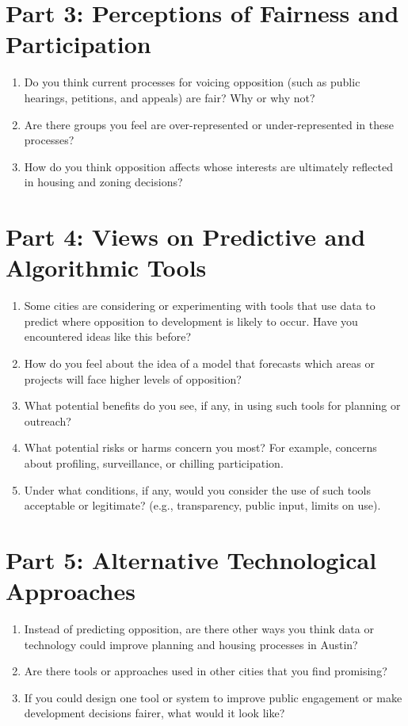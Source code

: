 \documentclass[10pt, letterpaper]{article}
\begin{document}
\section*{Part 3: Perceptions of Fairness and Participation}
\begin{enumerate}[leftmargin=*, label=\arabic*.]
    \item Do you think current processes for voicing opposition (such as public hearings, petitions, and appeals) are fair? Why or why not?
    \item Are there groups you feel are over-represented or under-represented in these processes?
    \item How do you think opposition affects whose interests are ultimately reflected in housing and zoning decisions?
\end{enumerate}

\section*{Part 4: Views on Predictive and Algorithmic Tools}
\begin{enumerate}[leftmargin=*, label=\arabic*.]
    \item Some cities are considering or experimenting with tools that use data to predict where opposition to development is likely to occur. Have you encountered ideas like this before?
    \item How do you feel about the idea of a model that forecasts which areas or projects will face higher levels of opposition?
    \item What potential benefits do you see, if any, in using such tools for planning or outreach?
    \item What potential risks or harms concern you most? For example, concerns about profiling, surveillance, or chilling participation.
    \item Under what conditions, if any, would you consider the use of such tools acceptable or legitimate? (e.g., transparency, public input, limits on use).
\end{enumerate}

\section*{Part 5: Alternative Technological Approaches}
\begin{enumerate}[leftmargin=*, label=\arabic*.]
    \item Instead of predicting opposition, are there other ways you think data or technology could improve planning and housing processes in Austin?
    \item Are there tools or approaches used in other cities that you find promising?
    \item If you could design one tool or system to improve public engagement or make development decisions fairer, what would it look like?
\end{enumerate}
\end{document}
